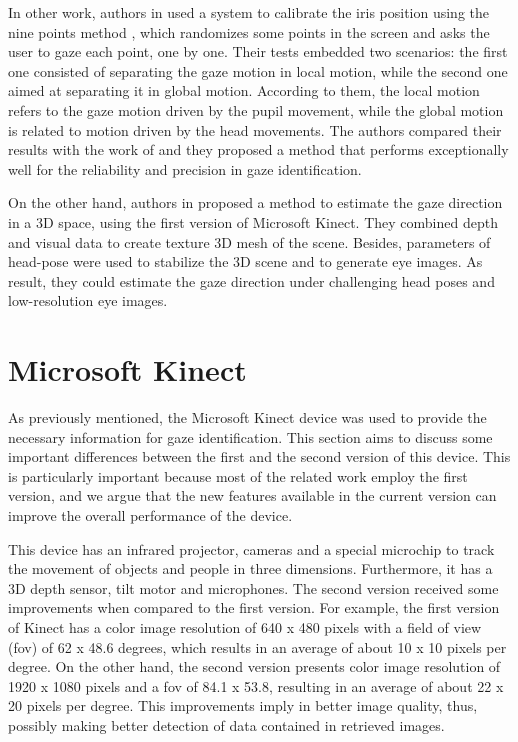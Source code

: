 \documentclass[10pt, conference]{IEEEtran}
\begin{document}
	In other work, authors in \cite{8} used a system to calibrate the iris position using the nine points method \cite{9}, which randomizes some points in the screen and asks the user to gaze each point, one by one. 
	Their tests embedded two scenarios: the first one consisted of separating the gaze motion in local motion, while the second one aimed at separating it in global motion. 
	According to them, the local motion refers to the gaze motion driven by the pupil movement, while the global motion is related to motion driven by the head movements. 
	The authors compared their results with the work of \cite{9} and they proposed a method that performs exceptionally well for the reliability and precision in gaze identification.

	On the other hand, authors in \cite{10} proposed a method to estimate the gaze direction in a 3D space, using the first version of Microsoft Kinect. 
	They combined depth and visual data to create texture 3D mesh of the scene. 
	Besides, parameters of head-pose were used to stabilize the 3D scene and to generate eye images. 
	As result, they could estimate the gaze direction under challenging head poses and low-resolution eye images.

\section{Microsoft Kinect} \label{sec:technologyUsed}
    
	As previously mentioned, the Microsoft Kinect device was used to provide the necessary information for gaze identification.
	This section aims to discuss some important differences between the first and the second version of this device.
	This is particularly important because most of the related work employ the first version, and we argue that the new features available in the current version can improve the overall performance of the device.

	This device has an infrared projector, cameras and a special microchip to track the movement of objects and people in three dimensions. 
	Furthermore, it has a 3D depth sensor, tilt motor and microphones.
	The second version received some improvements when compared to the first version. 
	For example, the first version of Kinect has a color image resolution of 640 x 480 pixels with a field of view (fov) of 62 x 48.6 degrees, which results in an average of about 10 x 10 pixels per degree. 
	On the other hand, the second version presents color image resolution of 1920 x 1080 pixels and a fov of 84.1 x 53.8, resulting in an average of about 22 x 20 pixels per degree. 
	This improvements imply in better image quality, thus, possibly making better detection of data contained in retrieved images.
\end{document}
